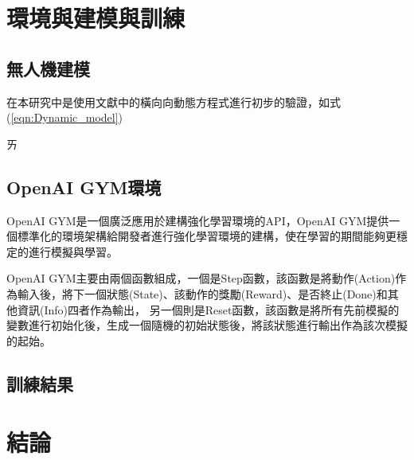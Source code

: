 \documentclass[a4paper, onecolumn, 11pt, AutoFakeBold]{article}
\newcommand{\texttwelve}{\fontsize{12}{12}\selectfont}
\renewcommand{\eqref}[1]{式(\ref{#1})}
\begin{document}
\begin{multicols*}{2}
\smallskip
\section{環境與建模與訓練}
\subsection{無人機建模}
在本研究中是使用文獻\cite{Optimal_Sliding_Mode_Controller_for_Fixed-wing_UAV}中的橫向向動態方程式進行初步的驗證，如\eqref{eqn:Dynamic_model}

ㄞ

\subsection{OpenAI GYM環境}
\par
OpenAI GYM是一個廣泛應用於建構強化學習環境的API，OpenAI GYM提供一個標準化的環境架構給開發者進行強化學習環境的建構，使在學習的期間能夠更穩定的進行模擬與學習。
\par
OpenAI GYM主要由兩個函數組成，一個是Step函數，該函數是將動作(Action)作為輸入後，將下一個狀態(State)、該動作的獎勵(Reward)、是否終止(Done)和其他資訊(Info)四者作為輸出，
\noindent 另一個則是Reset函數，該函數是將所有先前模擬的變數進行初始化後，生成一個隨機的初始狀態後，將該狀態進行輸出作為該次模擬的起始。

\smallskip
\subsection{訓練結果}

\smallskip
\section{結論}

\smallskip
\titleformat{\section}{\bfseries\texttwelve}{}{0em}{}
\printbibliography[title={參考文獻}]

\end{multicols*}
\end{document}
